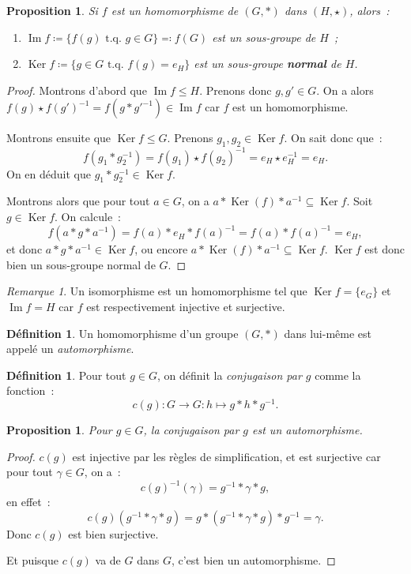 \documentclass{article}
\newtheorem{prp}[thm]{Proposition}
\theoremstyle{definition}
\newtheorem{déf}[thm]{Définition}
\theoremstyle{remark}
\newtheorem*{rmq}{Remarque}
\DeclareMathOperator{\Imf}{Im}
\DeclareMathOperator{\Ker}{Ker}
\newcommand{\tq}{\text{ t.q. }}
\begin{document}
		\begin{prp} Si $f$ est un homomorphisme de $(G, *)$ dans $(H, \star)$, alors~:
		\begin{enumerate}
			\item $\Imf f \coloneqq \{f(g) \tq g \in G\} \eqqcolon f(G)$ est un sous-groupe de $H$~;
			\item $\Ker f \coloneqq \{g \in G \tq f(g) = e_H\}$ est un sous-groupe \textbf{normal} de $H$.
		\end{enumerate}
		\end{prp}

		\begin{proof} Montrons d'abord que $\Imf f \leq H$. Prenons donc $g, g' \in G$. On a alors $f(g) \star f(g')^{-1} = f(g*{g'}^{-1}) \in \Imf f$ car $f$
		est un homomorphisme.

		Montrons ensuite que $\Ker f \leq G$. Prenons $g_1, g_2 \in \Ker f$. On sait donc que~:
		\[f(g_1 * g_2^{-1}) = f(g_1) \star f(g_2)^{-1} = e_H \star e_H^{-1} = e_H.\]
		On en déduit que $g_1*g_2^{-1} \in \Ker f$.

		Montrons alors que pour tout $a \in G$, on a $a*\Ker(f)*a^{-1} \subseteq \Ker f$. Soit $g \in \Ker f$. On calcule~:
		\[f\left(a*g*a^{-1}\right) = f(a)*e_H*f(a)^{-1} = f(a)*f(a)^{-1} = e_H,\]
		et donc $a*g*a^{-1} \in \Ker f$, ou encore $a*\Ker(f)*a^{-1} \subseteq \Ker f$. $\Ker f$ est donc bien un sous-groupe normal de $G$.
		\end{proof}

		\begin{rmq} Un isomorphisme est un homomorphisme tel que $\Ker f = \{e_G\}$ et $\Imf f = H$ car $f$ est respectivement injective et surjective.
		\end{rmq}

		\begin{déf} Un homomorphisme d'un groupe $(G, *)$ dans lui-même est appelé un \textit{automorphisme}.
		\end{déf}

		\begin{déf} Pour tout $g \in G$, on définit la \textit{conjugaison par $g$} comme la fonction~:
		\[c(g) : G \to G : h \mapsto g*h*g^{-1}.\]
		\end{déf}

		\begin{prp} Pour $g \in G$, la conjugaison par $g$ est un automorphisme.
		\end{prp}

		\begin{proof} $c(g)$ est injective par les règles de simplification, et est surjective car pour tout $\gamma \in G$, on a~:
		\[c(g)^{-1}(\gamma) = g^{-1}*\gamma*g,\]
		en effet~:
		\[c(g)(g^{-1}*\gamma*g) = g*\left(g^{-1}*\gamma*g\right)*g^{-1} = \gamma.\]
		Donc $c(g)$ est bien surjective.

		Et puisque $c(g)$ va de $G$ dans $G$, c'est bien un automorphisme.
		\end{proof}
\end{document}
